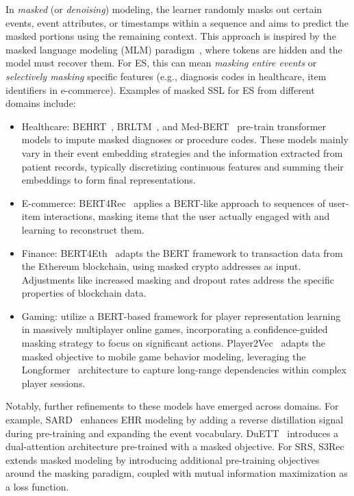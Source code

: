 \documentclass[twoside,11pt]{article}
\begin{document}
In {\it masked} (or {\it denoising}) modeling, the learner randomly masks out certain events, event attributes, or timestamps within a sequence and aims to predict the masked portions using the remaining context. This approach is inspired by the masked language modeling (MLM) paradigm~, where tokens are hidden and the model must recover them.
For ES, this can mean \emph{masking entire events} or \emph{selectively masking} specific features (e.g., diagnosis codes in healthcare, item identifiers in e-commerce). Examples of masked SSL for ES from different domains include:
\begin{itemize}
\item Healthcare: BEHRT~, BRLTM~, and Med-BERT~ pre-train transformer models to impute masked diagnoses or procedure codes. These models mainly vary in their event embedding strategies and the information extracted from patient records, typically discretizing continuous features and summing their embeddings to form final representations.

\item E-commerce: BERT4Rec~ applies a BERT-like approach to sequences of user-item interactions, masking items that the user actually engaged with and learning to reconstruct them.

\item Finance: BERT4Eth~ adapts the BERT framework to transaction data from the Ethereum blockchain, using masked crypto addresses as input. Adjustments like increased masking and dropout rates address the specific properties of blockchain data.

\item Gaming:  utilize a BERT-based framework for player representation learning in massively multiplayer online games, incorporating a confidence-guided masking strategy to focus on significant actions. Player2Vec~ adapts the masked objective to mobile game behavior modeling, leveraging the Longformer~ architecture to capture long-range dependencies within complex player sessions.
\end{itemize}

Notably, further refinements to these models have emerged across domains. For example, SARD~ enhances EHR modeling by adding a reverse distillation signal during pre-training and expanding the event vocabulary. DuETT~ introduces a dual-attention architecture pre-trained with a masked objective. For SRS, S3Rec~ extends masked modeling by introducing additional pre-training objectives around the masking paradigm, coupled with mutual information maximization as a loss function.
\end{document}

